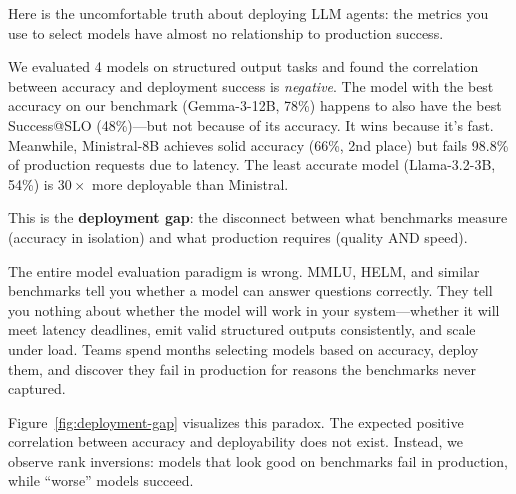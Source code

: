 \documentclass[11pt]{article}
\begin{document}
Here is the uncomfortable truth about deploying LLM agents: the metrics you use to select models have almost no relationship to production success.

We evaluated 4 models on structured output tasks and found the correlation between accuracy and deployment success is \emph{negative}.
The model with the best accuracy on our benchmark (Gemma-3-12B, 78\%) happens to also have the best Success@SLO (48\%)---but not because of its accuracy.
It wins because it's fast.
Meanwhile, Ministral-8B achieves solid accuracy (66\%, 2nd place) but fails 98.8\% of production requests due to latency.
The least accurate model (Llama-3.2-3B, 54\%) is $30\times$ more deployable than Ministral.

This is the \textbf{deployment gap}: the disconnect between what benchmarks measure (accuracy in isolation) and what production requires (quality AND speed).

The entire model evaluation paradigm is wrong.
MMLU, HELM, and similar benchmarks tell you whether a model can answer questions correctly.
They tell you nothing about whether the model will work in your system---whether it will meet latency deadlines, emit valid structured outputs consistently, and scale under load.
Teams spend months selecting models based on accuracy, deploy them, and discover they fail in production for reasons the benchmarks never captured.

Figure~\ref{fig:deployment-gap} visualizes this paradox.
The expected positive correlation between accuracy and deployability does not exist.
Instead, we observe rank inversions: models that look good on benchmarks fail in production, while ``worse'' models succeed.
\end{document}
